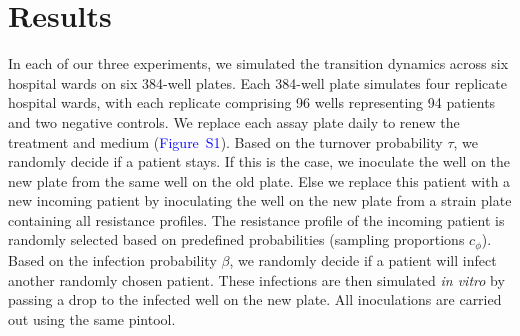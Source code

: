 \documentclass[9pt,twocolumn,twoside,lineno]{pnas-new}
\newcommand{\sifig}[1]{\textcolor{blue}{Figure~S#1}}
\begin{document}
    
    \section*{Results}
    In each of our three experiments, we simulated the transition dynamics across six hospital wards on six 384-well plates. 
    Each 384-well plate simulates four replicate hospital wards, with each replicate comprising 96 wells representing 94 patients and two negative controls.
    We replace each assay plate daily to renew the treatment and medium (\sifig{1}). 
    Based on the turnover probability $\tau$, we randomly decide if a patient stays. If this is the case, we inoculate the well on the new plate from the same well on the old plate. 
    Else we replace this patient with a new incoming patient by inoculating the well on the new plate from a strain plate containing all resistance profiles.
    The resistance profile of the incoming patient is randomly selected based on predefined probabilities (sampling proportions $c_\phi$).
    Based on the infection probability $\beta$, we randomly decide if a patient will infect another randomly chosen patient. 
    These infections are then simulated \textit{in vitro} by passing a drop to the infected well on the new plate.
    All inoculations are carried out using the same pintool.
    
\end{document}
